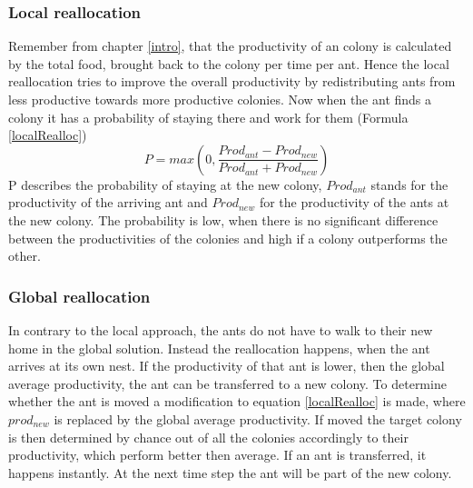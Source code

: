 \subsubsection{Local reallocation}
Remember from chapter \ref{intro}, that the productivity of an colony is calculated by the total food, brought back to the colony per time per ant. Hence the local reallocation tries to improve the overall productivity by redistributing ants from less productive towards more productive colonies. Now when the ant finds a colony it has a probability of staying there and work for them (Formula \ref{localRealloc})
\begin{equation} \label{localRealloc}
P = max(0,\frac{Prod_{ant}-Prod_{new}}{Prod_{ant}+Prod_{new}})
\end{equation}
P describes the probability of staying at the new colony, $Prod_{ant}$ stands for the productivity of the arriving ant and $Prod_{new}$ for the productivity of the ants at the new colony. The probability is low, when there is no significant difference between the productivities of the colonies and high if a colony outperforms the other.
\subsubsection{Global reallocation}
In contrary to the local approach, the ants do not have to walk to their new home in the global solution. Instead the reallocation happens, when the ant arrives at its own nest. If the productivity of that ant is lower, then the global average productivity, the ant can be transferred to a new colony. To determine whether the ant is moved a modification to equation \ref{localRealloc} is made, where $prod_{new}$ is replaced by the global average productivity. If moved the target colony is then determined by chance out of all the colonies accordingly to their productivity, which perform better then average.
If an ant is transferred, it happens instantly. At the next time step the ant will be part of the new colony.